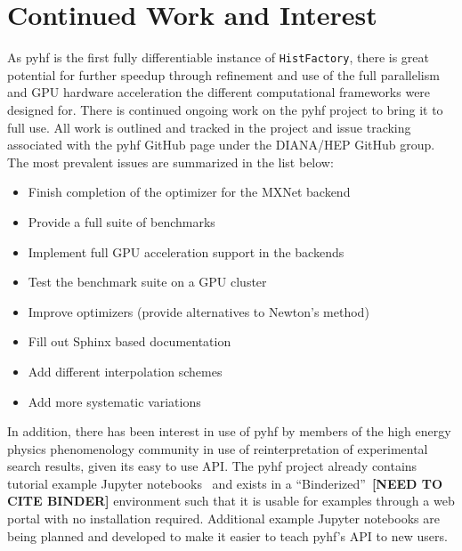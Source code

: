 \section{Continued Work and Interest}\label{section:continued_work}

As pyhf is the first fully differentiable instance of \texttt{HistFactory}, there is great potential for further speedup through refinement and use of the full parallelism and GPU hardware acceleration the different computational frameworks were designed for.
There is continued ongoing work on the pyhf project to bring it to full use.
All work is outlined and tracked in the project and issue tracking associated with the pyhf GitHub page under the DIANA/HEP GitHub group.
The most prevalent issues are summarized in the list below:

\begin{itemize}
 \item Finish completion of the optimizer for the MXNet backend
 \item Provide a full suite of benchmarks
 \item Implement full GPU acceleration support in the backends
 \item Test the benchmark suite on a GPU cluster
 \item Improve optimizers (provide alternatives to Newton's method)
 \item Fill out Sphinx based documentation
 \item Add different interpolation schemes
 \item Add more systematic variations
\end{itemize}

In addition, there has been interest in use of pyhf by members of the high energy physics phenomenology community in use of reinterpretation of experimental search results, given its easy to use API.
The pyhf project already contains tutorial example Jupyter notebooks~\cite{Kluyver:2016aa} and exists in a ``Binderized''~\textbf{[NEED TO CITE BINDER]} environment such that it is usable for examples through a web portal with no installation required.
Additional example Jupyter notebooks are being planned and developed to make it easier to teach pyhf's API to new users.
